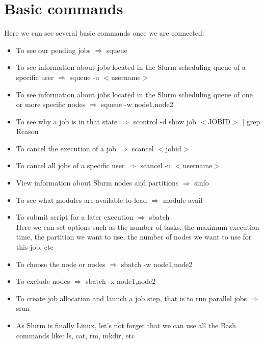 \documentclass[a4paper]{article}
\begin{document}
	\section{Basic commands}
		Here we can see several basic commands once we are connected:\\
		\begin{itemize}
			\item To see our pending jobs $\Rightarrow$ squeue\\
			\item To see information about jobs located in the Slurm scheduling queue of a specific user $\Rightarrow$ squeue -u $<$username$>$\\
			\item To see information about jobs located in the Slurm scheduling queue of one or more specific nodes $\Rightarrow$ squeue -w node1,node2\\
			\item To see why a job is in that state $\Rightarrow$ scontrol -d show job $<$JOBID$>$ $|$ grep Reason\\
			\item To cancel the execution of a job $\Rightarrow$ scancel $<$jobid$>$\\
			\item To cancel all jobs of a specific user $\Rightarrow$ scancel -u $<$username$>$\\
			\item View information about Slurm nodes and partitions $\Rightarrow$ sinfo\\
			\item To see what modules are available to load $\Rightarrow$ module avail
			\item To submit script for a later execution $\Rightarrow$ sbatch\\
				Here we can set options such as the number of tasks, the maximum execution time, the partition we want to use, the number of nodes we want to use for this job, etc
			\item To choose the node or nodes $\Rightarrow$ sbatch -w node1,node2\\
			\item To exclude nodes $\Rightarrow$ sbatch -x node1,node2\\
			\item To create job allocation and launch a job step, that is to run parallel jobs $\Rightarrow$ srun
			\item As Slurm is finally Linux, let's not forget that we can use all the Bash commands like: ls, cat, rm, mkdir, etc
		\end{itemize} 				
	
\end{document}
